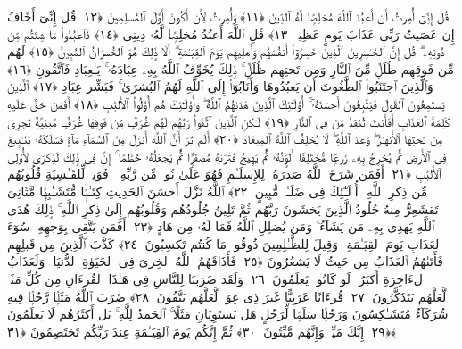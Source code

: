  قُل إِنِّىٓ أُمِرتُ أَن أَعبُدَ ٱللَّهَ مُخلِصًۭا لَّهُ ٱلدِّينَ ﴿١١﴾
 وَأُمِرتُ لِأَن أَكُونَ أَوَّلَ ٱلمُسلِمِينَ ﴿١٢﴾
 قُل إِنِّىٓ أَخَافُ إِن عَصَيتُ رَبِّى عَذَابَ يَومٍ عَظِيمٍۢ ﴿١٣﴾
 قُلِ ٱللَّهَ أَعبُدُ مُخلِصًۭا لَّهُۥ دِينِى ﴿١٤﴾
 فَٱعبُدُوا۟ مَا شِئتُم مِّن دُونِهِۦ ۗ قُل إِنَّ ٱلخَـٰسِرِينَ ٱلَّذِينَ خَسِرُوٓا۟ أَنفُسَهُم وَأَهلِيهِم يَومَ ٱلقِيَـٰمَةِ ۗ أَلَا ذَٟلِكَ هُوَ ٱلخُسرَانُ ٱلمُبِينُ ﴿١٥﴾
 لَهُم مِّن فَوقِهِم ظُلَلٌۭ مِّنَ ٱلنَّارِ وَمِن تَحتِهِم ظُلَلٌۭ ۚ ذَٟلِكَ يُخَوِّفُ ٱللَّهُ بِهِۦ عِبَادَهُۥ ۚ يَـٰعِبَادِ فَٱتَّقُونِ ﴿١٦﴾
 وَٱلَّذِينَ ٱجتَنَبُوا۟ ٱلطَّٰغُوتَ أَن يَعبُدُوهَا وَأَنَابُوٓا۟ إِلَى ٱللَّهِ لَهُمُ ٱلبُشرَىٰ ۚ فَبَشِّر عِبَادِ ﴿١٧﴾
 ٱلَّذِينَ يَستَمِعُونَ ٱلقَولَ فَيَتَّبِعُونَ أَحسَنَهُۥٓ ۚ أُو۟لَـٰٓئِكَ ٱلَّذِينَ هَدَىٰهُمُ ٱللَّهُ ۖ وَأُو۟لَـٰٓئِكَ هُم أُو۟لُوا۟ ٱلأَلبَٰبِ ﴿١٨﴾
 أَفَمَن حَقَّ عَلَيهِ كَلِمَةُ ٱلعَذَابِ أَفَأَنتَ تُنقِذُ مَن فِى ٱلنَّارِ ﴿١٩﴾
 لَـٰكِنِ ٱلَّذِينَ ٱتَّقَوا۟ رَبَّهُم لَهُم غُرَفٌۭ مِّن فَوقِهَا غُرَفٌۭ مَّبنِيَّةٌۭ تَجرِى مِن تَحتِهَا ٱلأَنهَـٰرُ ۖ وَعدَ ٱللَّهِ ۖ لَا يُخلِفُ ٱللَّهُ ٱلمِيعَادَ ﴿٢٠﴾
 أَلَم تَرَ أَنَّ ٱللَّهَ أَنزَلَ مِنَ ٱلسَّمَآءِ مَآءًۭ فَسَلَكَهُۥ يَنَـٰبِيعَ فِى ٱلأَرضِ ثُمَّ يُخرِجُ بِهِۦ زَرعًۭا مُّختَلِفًا أَلوَٟنُهُۥ ثُمَّ يَهِيجُ فَتَرَىٰهُ مُصفَرًّۭا ثُمَّ يَجعَلُهُۥ حُطَٰمًا ۚ إِنَّ فِى ذَٟلِكَ لَذِكرَىٰ لِأُو۟لِى ٱلأَلبَٰبِ ﴿٢١﴾
 أَفَمَن شَرَحَ ٱللَّهُ صَدرَهُۥ لِلإِسلَـٰمِ فَهُوَ عَلَىٰ نُورٍۢ مِّن رَّبِّهِۦ ۚ فَوَيلٌۭ لِّلقَـٰسِيَةِ قُلُوبُهُم مِّن ذِكرِ ٱللَّهِ ۚ أُو۟لَـٰٓئِكَ فِى ضَلَـٰلٍۢ مُّبِينٍ ﴿٢٢﴾
 ٱللَّهُ نَزَّلَ أَحسَنَ ٱلحَدِيثِ كِتَـٰبًۭا مُّتَشَـٰبِهًۭا مَّثَانِىَ تَقشَعِرُّ مِنهُ جُلُودُ ٱلَّذِينَ يَخشَونَ رَبَّهُم ثُمَّ تَلِينُ جُلُودُهُم وَقُلُوبُهُم إِلَىٰ ذِكرِ ٱللَّهِ ۚ ذَٟلِكَ هُدَى ٱللَّهِ يَهدِى بِهِۦ مَن يَشَآءُ ۚ وَمَن يُضلِلِ ٱللَّهُ فَمَا لَهُۥ مِن هَادٍ ﴿٢٣﴾
 أَفَمَن يَتَّقِى بِوَجهِهِۦ سُوٓءَ ٱلعَذَابِ يَومَ ٱلقِيَـٰمَةِ ۚ وَقِيلَ لِلظَّـٰلِمِينَ ذُوقُوا۟ مَا كُنتُم تَكسِبُونَ ﴿٢٤﴾
 كَذَّبَ ٱلَّذِينَ مِن قَبلِهِم فَأَتَىٰهُمُ ٱلعَذَابُ مِن حَيثُ لَا يَشعُرُونَ ﴿٢٥﴾
 فَأَذَاقَهُمُ ٱللَّهُ ٱلخِزىَ فِى ٱلحَيَوٰةِ ٱلدُّنيَا ۖ وَلَعَذَابُ ٱلءَاخِرَةِ أَكبَرُ ۚ لَو كَانُوا۟ يَعلَمُونَ ﴿٢٦﴾
 وَلَقَد ضَرَبنَا لِلنَّاسِ فِى هَـٰذَا ٱلقُرءَانِ مِن كُلِّ مَثَلٍۢ لَّعَلَّهُم يَتَذَكَّرُونَ ﴿٢٧﴾
 قُرءَانًا عَرَبِيًّا غَيرَ ذِى عِوَجٍۢ لَّعَلَّهُم يَتَّقُونَ ﴿٢٨﴾
 ضَرَبَ ٱللَّهُ مَثَلًۭا رَّجُلًۭا فِيهِ شُرَكَآءُ مُتَشَـٰكِسُونَ وَرَجُلًۭا سَلَمًۭا لِّرَجُلٍ هَل يَستَوِيَانِ مَثَلًا ۚ ٱلحَمدُ لِلَّهِ ۚ بَل أَكثَرُهُم لَا يَعلَمُونَ ﴿٢٩﴾
 إِنَّكَ مَيِّتٌۭ وَإِنَّهُم مَّيِّتُونَ ﴿٣٠﴾
 ثُمَّ إِنَّكُم يَومَ ٱلقِيَـٰمَةِ عِندَ رَبِّكُم تَختَصِمُونَ ﴿٣١﴾
